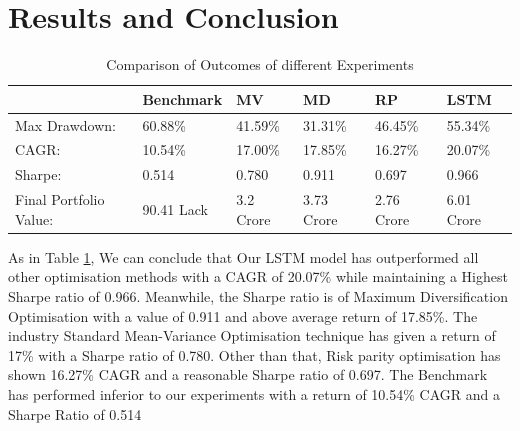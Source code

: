 \section{Results and Conclusion}
\begin{table}[H]
\centering
\begin{tabular}{|l|l|l|l|l|l|}
\hline
 & Benchmark & MV & MD & RP & LSTM \\ \hline
Max Drawdown: & 60.88\% & 41.59\% & 31.31\% & 46.45\% & 55.34\% \\ \hline
CAGR: & 10.54\% & 17.00\% & 17.85\% & 16.27\% & 20.07\% \\ \hline
Sharpe: & 0.514 & 0.780 & 0.911 & 0.697 & 0.966 \\ \hline
Final Portfolio Value: & 90.41 Lack & 3.2 Crore & 3.73 Crore & 2.76 Crore & 6.01 Crore \\ \hline
\end{tabular}
\caption{Comparison of Outcomes of different Experiments}
\label{tab:Overall Conclusion}
\end{table}
As in Table \ref{tab:Overall Conclusion}, We can conclude that Our LSTM model has outperformed all other optimisation methods with a CAGR of 20.07\% while maintaining a Highest Sharpe ratio of 0.966. Meanwhile, the Sharpe ratio is of Maximum Diversification Optimisation with a value of 0.911 and above average return of 17.85\%. The industry Standard Mean-Variance Optimisation technique has given a return of 17\% with a Sharpe ratio of 0.780. Other than that, Risk parity optimisation has shown 16.27\% CAGR and a reasonable Sharpe ratio of 0.697.
The Benchmark has performed inferior to our experiments with a return of 10.54\% CAGR and a Sharpe Ratio of 0.514
